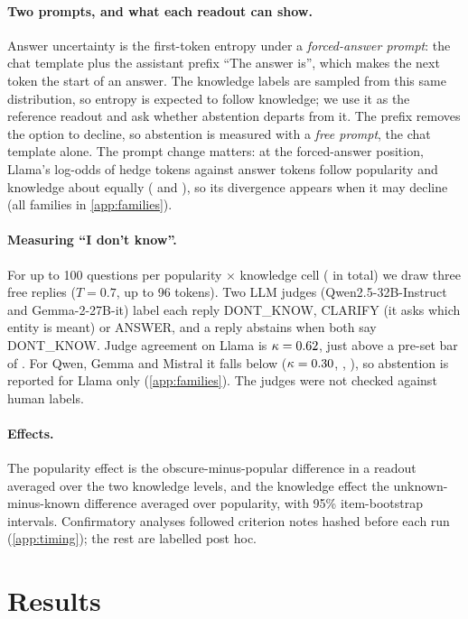 \documentclass{article}
\newcommand{\idk}{``I don't know''}
\begin{document}
\paragraph{Two prompts, and what each readout can show.} Answer uncertainty is the first-token entropy under a \emph{forced-answer prompt}: the chat template plus the assistant prefix ``The answer is'', which makes the next token the start of an answer. The knowledge labels are sampled from this same distribution, so entropy is expected to follow knowledge; we use it as the reference readout and ask whether abstention departs from it. The prefix removes the option to decline, so abstention is measured with a \emph{free prompt}, the chat template alone. The prompt change matters: at the forced-answer position, Llama's log-odds of hedge tokens against answer tokens follow popularity and knowledge about equally (\loLlamaPop{} and \loLlamaKnow), so its divergence appears when it may decline (all families in \cref{app:families}).

\paragraph{Measuring \idk.} For up to 100 questions per popularity $\times$ knowledge cell (\hmLlamaItems{} in total) we draw three free replies ($T=0.7$, up to 96 tokens). Two LLM judges (Qwen2.5-32B-Instruct and Gemma-2-27B-it) label each reply DONT\_KNOW, CLARIFY (it asks which entity is meant) or ANSWER, and a reply abstains when both say DONT\_KNOW. Judge agreement on Llama is $\kappa=0.62$, just above a pre-set bar of \kappaBar. For Qwen, Gemma and Mistral it falls below ($\kappa=0.30$, \hmGemmaKappa, \hmMistralKappa), so abstention is reported for Llama only (\cref{app:families}). The judges were not checked against human labels.

\paragraph{Effects.} The popularity effect is the obscure-minus-popular difference in a readout averaged over the two knowledge levels, and the knowledge effect the unknown-minus-known difference averaged over popularity, with 95\% item-bootstrap intervals. Confirmatory analyses followed criterion notes hashed before each run (\cref{app:timing}); the rest are labelled post hoc.

\section{Results}
\end{document}
